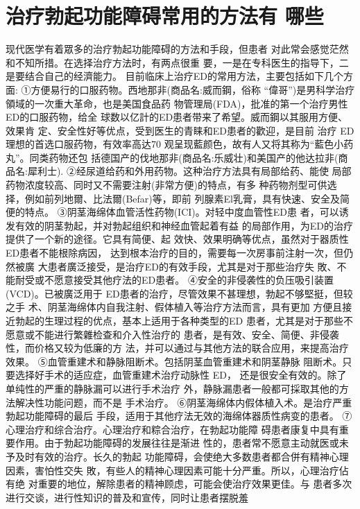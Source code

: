 \documentclass[12pt,UTF8]{ctexbook}
\begin{document}
\section{治疗勃起功能障碍常用的方法有
哪些}
现代医学有着眾多的治疗勃起功能障碍的方法和手段，但患者
对此常会感觉茫然和不知所措。在选择治疗方法时，有两点很重
要，一是在专科医生的指导下，二是要结合自己的经濟能力。
目前临床上治疗ED的常用方法，主要包括如下几个方面:
①方便易行的口服药物。西地那非(商品名:威而鋼，俗称
“偉哥”)是男科学治疗領域的一次重大革命，也是美国食品药
物管理局(FDA)，批准的第一个治疗男性ED的口服药物，给全
球数以亿計的ED患者带来了希望。威而鋼以其服用方便、效果肯
定、安全性好等优点，受到医生的青睐和ED患者的歡迎，是目前
治疗 ED 理想的首选口服药物，有效率高达70%
观呈现藍颜色，故有人又将其称为“藍色小药丸”。同类药物还包
括德国产的伐地那非(商品名:乐威壮)和美国产的他达拉非(商
品名:犀利士).
②经尿道给药和外用药物。这种治疗方法具有局部给药、能使
局部药物浓度较高、同时又不需要注射(非常方便)的特点，有多
种药物剂型可供选择，例如前列地爾、比法爾(Befar)等，即前
列腺素El乳膏，具有快速、安全及简便的特点。
③阴茎海绵体血管活性药物(ICI)。对轻中度血管性ED患
者，可以诱发有效的阴茎勃起，并对勃起组织和神经血管起着有益
的局部作用，为ED的治疗提供了一个新的途径。它具有简便、起
效快、效果明确等优点，虽然对于器质性ED患者不能根除病因，
达到根本治疗的目的，需要每一次房事前注射一次，但仍然被廣
大患者廣泛接受，是治疗ED的有效手段，尤其是对于那些治疗失
敗、不能耐受或不愿意接受其他疗法的ED患者。
④安全的非侵袭性的负压吸引装置(VCD)。已被廣泛用于
ED患者的治疗，尽管效果不甚理想，勃起不够堅挺，但较之手
术、阴茎海绵体内自我注射、假体植入等治疗方法而言，具有更加
方便且接近勃起的生理过程的优点，基本上适用于各种类型的ED
患者，尤其是对于那些不愿意或不能进行繁雜检查和介入性治疗的
患者，是有效、安全、简便、非侵袭性，而价格又较为低廉的方
法，并可以通过与其他方法的联合应用，来提高治疗效果。
⑤血管重建术和静脉阻断术。包括阴茎血管重建术和阴茎静脉
阻断术。只要选择好手术的适应症，血管重建术治疗动脉性 ED，
还是很安全有效的。除了单纯性的严重的静脉漏可以进行手术治疗
外，静脉漏患者一般都可採取其他的方法解决性功能问题，而不是
手术治疗。
⑥阴茎海绵体内假体植入术。是治疗严重勃起功能障碍的最后
手段，适用于其他疗法无效的海绵体器质性病变的患者。
⑦心理治疗和综合治疗。心理治疗和粽合治疗，在勃起功能障
碍患者康复中具有重要作用。由于勃起功能障碍的发展往往是渐进
性的，患者常不愿意主动就医或未予及时有效的治疗。长久的勃起
功能障碍，会使绝大多数患者都合併有精神心理因素，害怕性交失
敗，有些人的精神心理因素可能十分严重。所以，心理治疗佔有绝
对重要的地位，解除患者的精神顾虑，可能会使治疗效果更佳。与
患者多次进行交谈，进行性知识的普及和宣传，同时让患者摆脱羞
\end{document}
